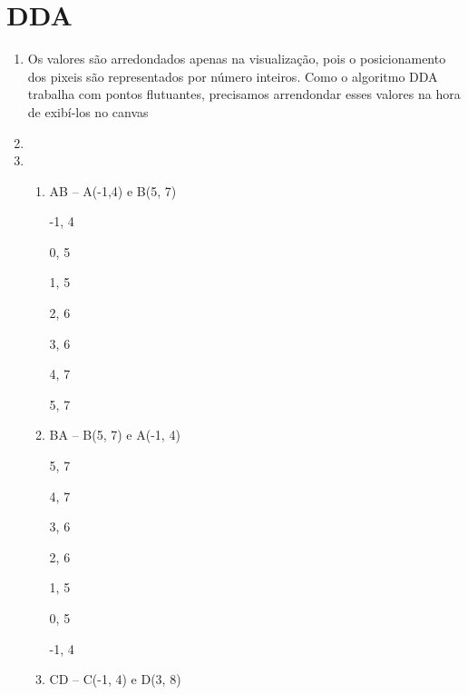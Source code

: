 \section*{DDA}

	\begin{enumerate}\addtocounter{enumi}{7}
		\item 
		Os valores são arredondados apenas na visualização, pois o posicionamento
		dos pixeis são representados por número inteiros. Como o algoritmo DDA trabalha
		com pontos flutuantes, precisamos arrendondar esses valores na hora de exibí-los no
		canvas
		\item 

		\item 
		
		\begin{enumerate}[label=\alph*.]
				   \setlength\itemsep{1em}
					\item	 AB – A(-1,4) e B(5, 7)
					   				
                         -1, 4
                         
                          0, 5
                          
                           1, 5
                           
                           2, 6
                           
                           3, 6
                           
                           4, 7
                           
                            5, 7
					
					\item    BA – B(5, 7) e A(-1, 4)
					
                           5, 7
                           
                          4, 7
                          
                          3, 6
                          
                          2, 6
                          
                          1, 5
                          
                         0, 5
                         
                         -1, 4
									
					\item  CD – C(-1, 4) e D(3, 8)
					

\end{enumerate}
\end{enumerate}
